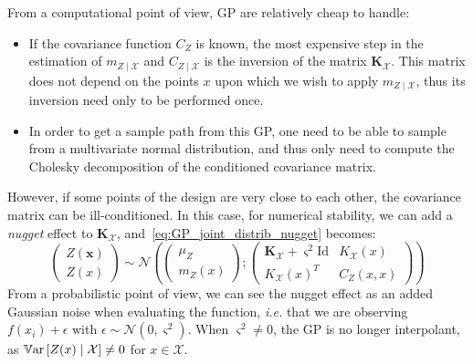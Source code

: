 \documentclass[../../Main_ManuscritThese.tex]{subfiles}
\begin{document}
From a computational point of view, GP are relatively cheap to handle:
\begin{itemize}
\item If the covariance function $C_Z$ is known, the most expensive step in the estimation of $m_{Z\mid \mathcal{X}}$ and $C_{Z \mid \mathcal{X}}$ is the inversion of the matrix $\mathbf{K}_{\mathcal{X}}$. This matrix does not depend on the points $x$ upon which we wish to apply $m_{Z\mid \mathcal{X}}$, thus its inversion need only to be performed once.
\item In order to get a sample path from this GP, one need to be able to sample from a multivariate normal distribution, and thus only need to compute the Cholesky decomposition of the conditioned covariance matrix.
\end{itemize}
However, if some points of the design are very close to each other, the covariance matrix can be ill-conditioned. In this case,
for numerical stability, we can add a \emph{nugget} effect to $\mathbf{K}_{\mathcal{X}}$, and~\eqref{eq:GP_joint_distrib_nugget} becomes:
\begin{equation}
  \label{eq:GP_joint_distrib_nugget}
  \begin{pmatrix}
    Z(\mathbf{x}) \\
    Z(x)
  \end{pmatrix} \sim
  \mathcal{N}\left(
    \begin{pmatrix}
      \mu_Z \\
      m_{Z}(x)
    \end{pmatrix} ;
    \begin{pmatrix}
      \mathbf{K}_{\mathcal{X}} + \varsigma^2\mathrm{Id}& K_{\mathcal{X}}(x) \\
       K_{\mathcal{X}}(x)^T & C_Z(x, x)
    \end{pmatrix}
\right)
\end{equation}
From a probabilistic point of view, we can see the nugget effect as an added Gaussian noise when evaluating the function,\emph{ i.e.} that we are observing $f(x_i)+\epsilon$ with $\epsilon \sim \mathcal{N}(0, \varsigma^2)$. When $\varsigma^2 \neq 0$, the GP is no longer interpolant, as $\mathbb{V}\mathrm{ar}\left[Z(x) \mid \mathcal{X}\right] \neq 0$ for $x\in \mathcal{X}$.
\end{document}
